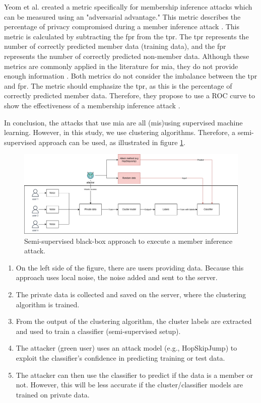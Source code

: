 Yeom et al. created a metric specifically for membership inference attacks which can be measured using an "adversarial advantage."
This metric describes the percentage of privacy compromised during a member inference attack \citep{yeom_privacy_2018}.
This metric is calculated by subtracting the \gls{fpr} from the \gls{tpr}.
The \gls{tpr} represents the number of correctly predicted member data (training data), and the \gls{fpr} represents the number of correctly predicted non-member data.
Although these metrics are commonly applied in the literature for \gls{mia}, they do not provide enough information \citep{carlini_membership_2022}.
Both metrics do not consider the imbalance between the \gls{tpr} and \gls{fpr}.
The metric should emphasize the \gls{tpr}, as this is the percentage of correctly predicted member data.
Therefore, they propose to use a ROC curve to show the effectiveness of a membership inference attack \citep{carlini_membership_2022}. \newline

In conclusion, the attacks that use \gls{mia} are all (mis)using supervised machine learning.
However, in this study, we use clustering algorithms.
Therefore, a semi-supervised approach can be used, as illustrated in figure \ref{figure:MIA-semi-supervised}.
\newpage
\begin{figure}[h]
  \includegraphics[width=1\textwidth]{TheorethicalFramework/Differential privacy/master-thesis-MIA.png}
  \caption{Semi-supervised black-box approach to execute a member inference attack.}
  \label{figure:MIA-semi-supervised}
\end{figure}

\begin{enumerate}
  \item On the left side of the figure, there are users providing data. Because this approach uses local noise, the noise added and sent to the server.
  \item The private data is collected and saved on the server, where the clustering algorithm is trained.
  \item From the output of the clustering algorithm, the cluster labels are extracted and used to train a classifier (semi-supervised setup).
  \item The attacker (green user) uses an attack model (e.g., HopSkipJump) to exploit the classifier's confidence in predicting training or test data.
  \item The attacker can then use the classifier to predict if the data is a member or not.
        However, this will be less accurate if the cluster/classifier models are trained on private data.
\end{enumerate}
